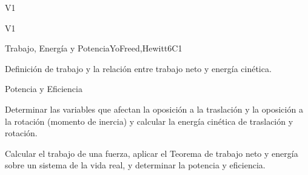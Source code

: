 \begin{syllabus}
\begin{specificoutcomes}{V1}
   \item {}
   \item {}
   \item {}
   \item {}
   \item {}
   \item {}
   \item {}
   \item {}
   \item {}
   \item {}
   \item {}
   \item {}
   \item {}
   \item {}
   \item {}
\end{specificoutcomes}

\begin{competences}{V1}
  \item {} 
  \item {}
  \item {}
\end{competences}

\begin{unit}{Trabajo, Energía y Potencia}{}{YoFreed,Hewitt}{6}{C1}
   \begin{topics}
      \item Definición de trabajo y la relación entre trabajo neto y energía cinética.
      \item Potencia y Eficiencia
   \end{topics}

   \begin{learningoutcomes}
      \item Determinar las variables que afectan la oposición a la traslación y la oposición a la rotación (momento de inercia) y calcular la energía cinética de traslación y rotación.
      \item Calcular el trabajo de una fuerza, aplicar el Teorema de trabajo neto y energía sobre un sistema de la vida real, y determinar la potencia y eficiencia.
   \end{learningoutcomes}
\end{unit}


\end{syllabus}
